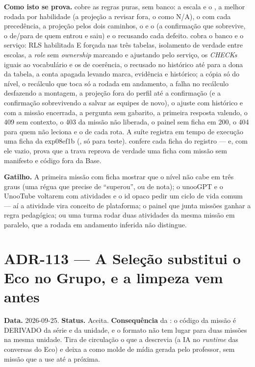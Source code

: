 \textbf{Como isto se prova.} 
cobre as regras puras, sem banco: a escala e o , a melhor rodada por
habilidade (a projeção a revisar fora, o  como N/A), o
 com cada precedência, a projeção pelos dois caminhos, o
 e o  (a confirmação que sobrevive, o
de/para de quem entrou e saiu) e o  recusando cada defeito.
 cobra o banco e o serviço: RLS
habilitada E forçada nas três tabelas, isolamento de verdade entre escolas, a
\emph{role} sem \emph{ownership} marcando e ajustando pelo serviço, os
\emph{CHECKs} iguais ao vocabulário e os de coerência, o  recusado no
histórico até para a dona da tabela, a conta apagada levando marca, evidência e
histórico; a cópia só do nível, o recálculo que toca só a rodada em andamento, a
falha no recálculo desfazendo a montagem, a projeção fora do perfil até a
confirmação (e a confirmação sobrevivendo a salvar as equipes de novo), o
ajuste com histórico e com a missão encerrada, a pergunta sem gabarito, a
primeira resposta valendo, o 409 sem contexto, o 403 da missão não liberada, o
painel sem ficha em 200, o 404 para quem não leciona e o  de cada
rota. A suíte registra em tempo de execução uma ficha da exp08ef1b
(, só para teste). 
confere cada ficha do registro --- e, com ele vazio, prova que a trava reprova
de verdade uma ficha com missão sem manifesto e código fora da Base.

\textbf{Gatilho.} A primeira missão com ficha mostrar que o nível não cabe em
três graus (uma régua que precise de \enquote{superou}, ou de nota); o unooGPT e
o UnooTube voltarem com atividades e o id opaco pedir um ciclo de vida comum ---
aí a atividade vira conceito de plataforma; o painel que junta missões ganhar a
regra pedagógica; ou uma turma rodar duas atividades da mesma missão em
paralelo, que a rodada em andamento inferida não distingue.

\section{ADR-113 --- A Seleção substitui o Eco no Grupo, e a limpeza vem antes}
\label{adr:a-selecao-substitui-o-eco}

\textbf{Data.} 2026-09-25. \textbf{Status.} Aceita.
\textbf{Consequência} da : o código da missão é DERIVADO da série e
da unidade, e o formato não tem lugar para duas missões na mesma unidade. Tira
de circulação o que a  descrevia (a IA no \emph{runtime} das
conversas do Eco) e deixa a  como molde de mídia gerada pelo
professor, sem missão que a use até a próxima.

